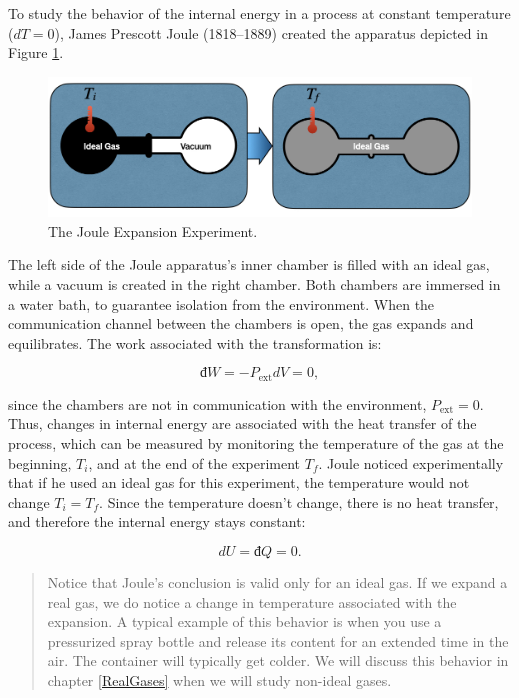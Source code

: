 \documentclass[
  9pt,
]{extbook}
\theoremstyle{definition}
\theoremstyle{definition}
\theoremstyle{definition}
\theoremstyle{remark}
\begin{document}
To study the behavior of the internal energy in a process at constant temperature (\(dT=0\)), James Prescott Joule (1818--1889) created the apparatus depicted in Figure \ref{fig:FigJexp}.

\begin{figure}

{\centering \includegraphics[width=0.8\linewidth]{./img/OEP_Figures.006} 

}

\caption{The Joule Expansion Experiment.}\label{fig:FigJexp}
\end{figure}

The left side of the Joule apparatus's inner chamber is filled with an ideal gas, while a vacuum is created in the right chamber. Both chambers are immersed in a water bath, to guarantee isolation from the environment. When the communication channel between the chambers is open, the gas expands and equilibrates. The work associated with the transformation is:

\begin{equation}
  đ W=-P_{\text{ext}}dV = 0,
  \label{eq:JexpW}
\end{equation}

since the chambers are not in communication with the environment, \(P_{\text{ext}}=0\). Thus, changes in internal energy are associated with the heat transfer of the process, which can be measured by monitoring the temperature of the gas at the beginning, \(T_i\), and at the end of the experiment \(T_f\). Joule noticed experimentally that if he used an ideal gas for this experiment, the temperature would not change \(T_i = T_f\). Since the temperature doesn't change, there is no heat transfer, and therefore the internal energy stays constant:

\begin{equation}
  dU = đ Q = 0.
  \label{eq:JexpQU}
\end{equation}

\begin{quote}
Notice that Joule's conclusion is valid only for an ideal gas. If we expand a real gas, we do notice a change in temperature associated with the expansion. A typical example of this behavior is when you use a pressurized spray bottle and release its content for an extended time in the air. The container will typically get colder. We will discuss this behavior in chapter \ref{RealGases} when we will study non-ideal gases.
\end{quote}
\end{document}

